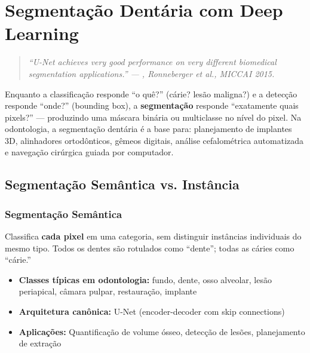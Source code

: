 
\chapter{Segmentação Dentária com Deep Learning}
\label{cap:segmentacao-dental}

\nivelquatro

\begin{quote}
\itshape\small
``U-Net achieves very good performance on very different biomedical segmentation
applications.'' --- , Ronneberger et al., MICCAI 2015.
\end{quote}

Enquanto a classificação responde ``o quê?'' (cárie? lesão maligna?) e a detecção
responde ``onde?'' (bounding box), a \textbf{segmentação} responde ``exatamente
quais pixels?'' --- produzindo uma máscara binária ou multiclasse no nível do pixel.
Na odontologia, a segmentação dentária é a base para: planejamento de implantes
3D, alinhadores ortodônticos, gêmeos digitais, análise cefalométrica automatizada
e navegação cirúrgica guiada por computador.


\section{Segmentação Semântica vs. Instância}
\label{sec:tipos-segmentacao}

\subsection{Segmentação Semântica}

Classifica \textbf{cada pixel} em uma categoria, sem distinguir instâncias
individuais do mesmo tipo. Todos os dentes são rotulados como ``dente'';
todas as cáries como ``cárie.''

\begin{itemize}
  \item \textbf{Classes típicas em odontologia:} fundo, dente, osso alveolar,
        lesão periapical, câmara pulpar, restauração, implante
  \item \textbf{Arquitetura canônica:} U-Net (encoder-decoder com skip connections)
  \item \textbf{Aplicações:} Quantificação de volume ósseo, detecção de lesões,
        planejamento de extração
\end{itemize}

